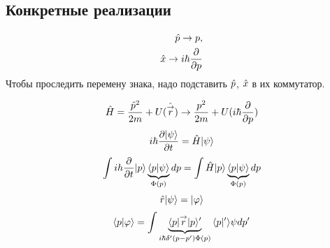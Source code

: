 \subsection{Конкретные реализации}
\begin{eqnarray*}
    \Hat p \to p,\\
    \Hat x \to i\hbar \ud{}{p}
\end{eqnarray*}
Чтобы проследить перемену знака, надо подставить $\Hat p$, $\Hat x$ в их коммутатор.

$$
    \Hat H = \frac{{\Hat p}^2}{2m} + U({\Hat {\vec{r}}}) \rightarrow 
        \frac{p^2}{2m} + U(i{\hbar}\frac{\partial}{\partial p})
$$
$$
    i{\hbar}\frac{\partial \qu \psi}{\partial t} = {\Hat H} \qu \psi
$$
$$
    \int ih \frac{\partial}{\partial t} {\qu p} \underbrace{\qs p \psi}_{\Phi(p)} dp =
        \int {\Hat H}{\qu p} \underbrace{\qs p \psi}_{\Phi(p)} dp
$$
$$
    {\Hat r} {\qu \psi} = {\qu \phi}
$$
$$
    {\qs p \phi} = \int \underbrace{{\uq p} \vec{r} {\qu p'}}_{i{\hbar}{\delta}'(p-p')\Phi(p)} 
        {\qs p' \psi} dp'
$$